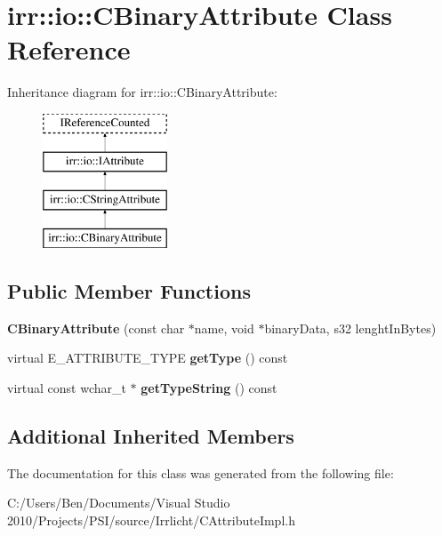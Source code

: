 \hypertarget{classirr_1_1io_1_1_c_binary_attribute}{\section{irr\-:\-:io\-:\-:C\-Binary\-Attribute Class Reference}
\label{classirr_1_1io_1_1_c_binary_attribute}
}
Inheritance diagram for irr\-:\-:io\-:\-:C\-Binary\-Attribute\-:\begin{figure}[H]
\begin{center}
\leavevmode
\includegraphics[height=4.000000cm]{classirr_1_1io_1_1_c_binary_attribute}
\end{center}
\end{figure}
\subsection*{Public Member Functions}
\begin{DoxyCompactItemize}
\item 
\hypertarget{classirr_1_1io_1_1_c_binary_attribute_a0d4f31c505f0f135af9abef2303eb356}{{\bfseries C\-Binary\-Attribute} (const char $\ast$name, void $\ast$binary\-Data, s32 lenght\-In\-Bytes)}\label{classirr_1_1io_1_1_c_binary_attribute_a0d4f31c505f0f135af9abef2303eb356}

\item 
\hypertarget{classirr_1_1io_1_1_c_binary_attribute_abe44aeda8ec8bf06a315463f9f058642}{virtual E\-\_\-\-A\-T\-T\-R\-I\-B\-U\-T\-E\-\_\-\-T\-Y\-P\-E {\bfseries get\-Type} () const }\label{classirr_1_1io_1_1_c_binary_attribute_abe44aeda8ec8bf06a315463f9f058642}

\item 
\hypertarget{classirr_1_1io_1_1_c_binary_attribute_a4570c31c2f6160067670b653bf29b05d}{virtual const wchar\-\_\-t $\ast$ {\bfseries get\-Type\-String} () const }\label{classirr_1_1io_1_1_c_binary_attribute_a4570c31c2f6160067670b653bf29b05d}

\end{DoxyCompactItemize}
\subsection*{Additional Inherited Members}


The documentation for this class was generated from the following file\-:\begin{DoxyCompactItemize}
\item 
C\-:/\-Users/\-Ben/\-Documents/\-Visual Studio 2010/\-Projects/\-P\-S\-I/source/\-Irrlicht/C\-Attribute\-Impl.\-h\end{DoxyCompactItemize}
